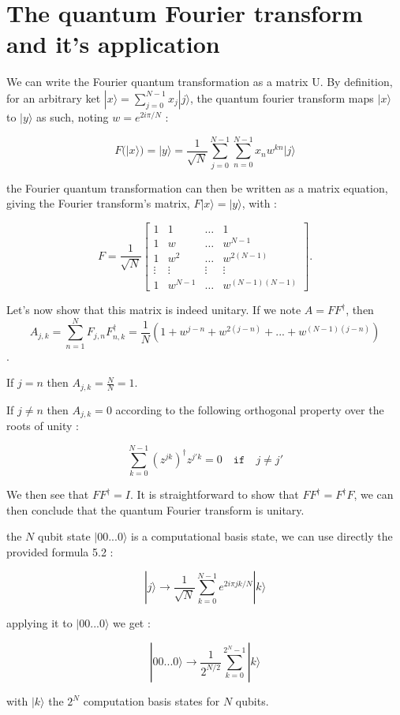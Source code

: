 \chapter{The quantum Fourier transform and it's application}




We can write the Fourier quantum transformation as a matrix U.
By definition, for an arbitrary ket $|x\rangle = \sum_{j=0}^{N-1} x_j | j \rangle$, the 
quantum fourier transform maps $|x\rangle$ to $|y\rangle$ as such, noting $w = e^{2 i \pi /N}$ :

$$F(|x\rangle) = |y\rangle = \frac{1}{\sqrt{N}}  \sum_{j=0}^{N-1}  \sum_{n=0}^{N-1} x_n w^{k n} | j \rangle$$

the Fourier quantum transformation can then be written as a matrix equation, giving the Fourier transform's
matrix, $F |x\rangle = |y\rangle$, with :

$$ F =  \frac{1}{\sqrt{N}} \begin{bmatrix}
	1      & 1       & \hdots & 1         \\
	1      & w       & \hdots & w^{N-1}   \\ 
	1      & w^2     & \hdots & w^{2(N-1)} \\
	\vdots & \vdots  & \vdots & \vdots     \\
	1      & w^{N-1} & \hdots & w^{(N-1)(N-1)}
\end{bmatrix}.$$

Let's now show that this matrix is indeed unitary.
If we note $A = F F^{\dagger}$, then 
$$A_{j,k} = \sum_{n=1}^N F_{j,n} F^{\dagger}_{n,k} = \frac{1}{N} (1 + w^{j-n}+w^{2(j-n)}+...+w^{(N-1)(j-n)})$$.

If $j=n$ then $A_{j,k} = \frac{N}{N} = 1$.

If $j \neq n$ then $A_{j,k} = 0$ according to the following orthogonal property over the roots of unity : 

$$ \sum_{k=0}^{N-1} (z^{jk})^\dagger z^{j' k} = 0 \quad \mathtt{if } \quad j \neq j'$$

We then see that $F F^{\dagger} = I$.
It is straightforward to show that $F F^{\dagger} =F^{\dagger} F$, we can then conclude that
the quantum Fourier transform is unitary.


the $N$ qubit state $|00...0 \rangle$ is a computational basis state, we can use directly the provided  formula 5.2 :

$$  |j\rangle \rightarrow \frac{1}{\sqrt{N}} \sum_{k=0}^{N-1}  e^{2 i \pi j k /N} |k \rangle$$

applying it to $|00...0 \rangle$ we get :

$$|00...0 \rangle \rightarrow \frac{1}{2^{N/2}} \sum_{k=0}^{2^N-1} |k \rangle$$

with $|k \rangle$ the $2^N$ computation basis states for $N$ qubits.

